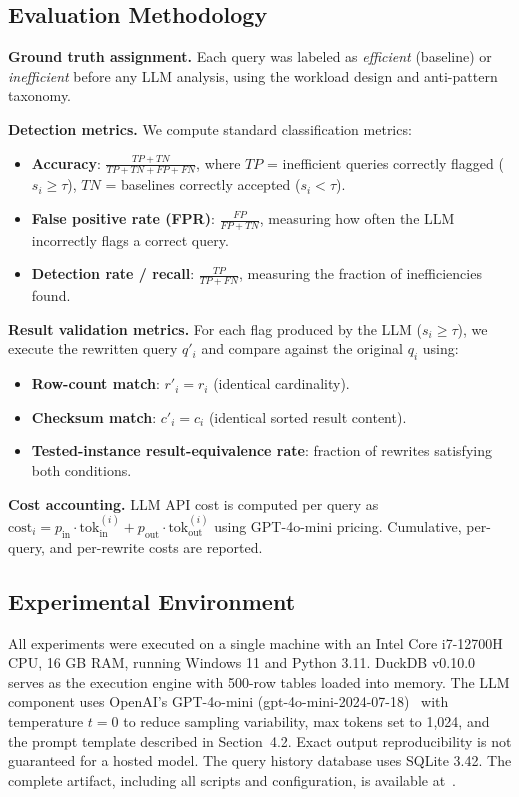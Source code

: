 \documentclass[conference]{IEEEtran}
\begin{document}
\subsection{Evaluation Methodology}
\noindent\textbf{Ground truth assignment.} Each query was labeled as \textit{efficient} (baseline) or \textit{inefficient} before any LLM analysis, using the workload design and anti-pattern taxonomy.

\noindent\textbf{Detection metrics.} We compute standard classification metrics:
\begin{itemize}
\item \textbf{Accuracy}: $\frac{TP + TN}{TP + TN + FP + FN}$, where $TP$ = inefficient queries correctly flagged ($s_i \geq \tau$), $TN$ = baselines correctly accepted ($s_i < \tau$).
\item \textbf{False positive rate (FPR)}: $\frac{FP}{FP + TN}$, measuring how often the LLM incorrectly flags a correct query.
\item \textbf{Detection rate / recall}: $\frac{TP}{TP + FN}$, measuring the fraction of inefficiencies found.
\end{itemize}

\noindent\textbf{Result validation metrics.} For each flag produced by the LLM ($s_i \geq \tau$), we execute the rewritten query $q'_i$ and compare against the original $q_i$ using:
\begin{itemize}
\item \textbf{Row-count match}: $r'_i = r_i$ (identical cardinality).
\item \textbf{Checksum match}: $c'_i = c_i$ (identical sorted result content).
\item \textbf{Tested-instance result-equivalence rate}: fraction of rewrites satisfying both conditions.
\end{itemize}

\noindent\textbf{Cost accounting.} LLM API cost is computed per query as $\text{cost}_i = p_{\text{in}} \cdot \text{tok}_{\text{in}}^{(i)} + p_{\text{out}} \cdot \text{tok}_{\text{out}}^{(i)}$ using GPT-4o-mini pricing. Cumulative, per-query, and per-rewrite costs are reported.

\subsection{Experimental Environment}
All experiments were executed on a single machine with an Intel Core i7-12700H CPU, 16 GB RAM, running Windows 11 and Python 3.11. DuckDB v0.10.0 serves as the execution engine with 500-row tables loaded into memory. The LLM component uses OpenAI's GPT-4o-mini (gpt-4o-mini-2024-07-18)~\cite{openai2026models} with temperature $t = 0$ to reduce sampling variability, max tokens set to 1,024, and the prompt template described in Section~4.2. Exact output reproducibility is not guaranteed for a hosted model. The query history database uses SQLite 3.42. The complete artifact, including all scripts and configuration, is available at~\cite{sharma2026framework}.
\end{document}
